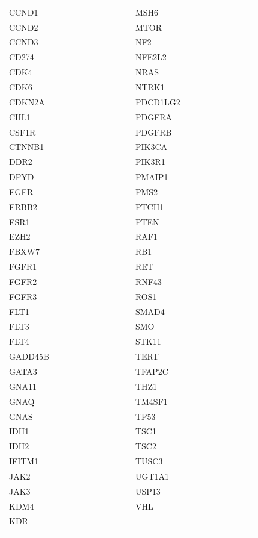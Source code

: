 \begin{table}
\begin{tabular}{|C{0.15\linewidth} | C{0.25\linewidth} | C{0.02\linewidth} | C{0.15\linewidth} | C{0.25\linewidth}|}
 CCND1 & &  & MSH6 & \\
 CCND2 & &  & MTOR & \\
 CCND3 & &  & NF2 & \\
 CD274 & &  & NFE2L2 & \\
 CDK4 & &  & NRAS & \\
 CDK6 & &  & NTRK1 & \\
 CDKN2A & &  & PDCD1LG2 & \\
 CHL1 & \textcite{Hoetzel2019} &  & PDGFRA & \\
 CSF1R & &  & PDGFRB & \\
 CTNNB1 & &  & PIK3CA & \\
 DDR2 & &  & PIK3R1 & \\
 DPYD & &  & PMAIP1 & \textcite{Do2019} \\
 EGFR & &  & PMS2 & \\
 ERBB2 & &  & PTCH1 & \\
 ESR1 & &  & PTEN & \\
 EZH2 & &  & RAF1 & \\
 FBXW7 & &  & RB1 & \\
 FGFR1 & &  & RET & \\
 FGFR2 & &  & RNF43 & \\
 FGFR3 & &  & ROS1 & \\
 FLT1 & &  & SMAD4 & \\
 FLT3 & &  & SMO & \\
 FLT4 & &  & STK11 & \\
 GADD45B & \textcite{Do2019} &  & TERT & \\
 GATA3 & &  & TFAP2C & \textcite{Do2019} \\
 GNA11 & &  & THZ1 & \textcite{Cheng2018} \\
 GNAQ & &  & TM4SF1 & \textcite{Ye2019} \\
 GNAS & &  & TP53 & \\
 IDH1 & &  & TSC1 & \\
 IDH2 & &  & TSC2 & \\
 IFITM1 & \textcite{Yang2018} &  & TUSC3 & \textcite{Feng2018a} \\
 JAK2 & &  & UGT1A1 & \\
 JAK3 & &  & USP13 & \textcite{Wu2019a} \\
 KDM4 & \textcite{Sun2020} &  & VHL & \\
 KDR & &  &  & \\
 \hhline{|-|-|~|-|-|}
\bottomrule
\end{tabular}
\end{table}


